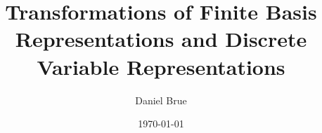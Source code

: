 \documentclass[12pt]{article}
\begin{document}
\title{Transformations of Finite Basis Representations and Discrete Variable Representations}
\author{Daniel Brue}
\date{\today}
\maketitle
\end{document}
